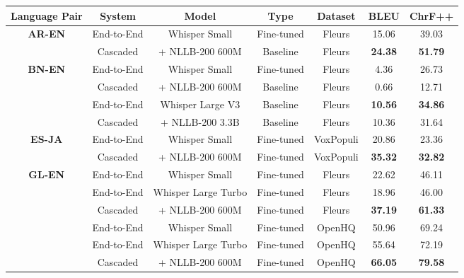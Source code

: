 \begin{table*}[ht]
\centering
\begin{tabular}{@{}ccccccc@{}}
\toprule
\textbf{Language Pair} & \textbf{System} & \textbf{Model} & \textbf{Type} & \textbf{Dataset} & \textbf{BLEU} & \textbf{ChrF++} \\ \midrule
\multirow{2}{*}{\textbf{AR-EN}} & End-to-End & Whisper Small       & Fine-tuned & Fleurs    & 15.06          & 39.03          \\
                                & Cascaded   & + NLLB-200 600M     & Baseline   & Fleurs    & \textbf{24.38} & \textbf{51.79} \\ \midrule
\multirow{4}{*}{\textbf{BN-EN}} & End-to-End & Whisper Small       & Fine-tuned & Fleurs    & 4.36           & 26.73          \\
                                & Cascaded   & + NLLB-200 600M           & Baseline   & Fleurs    & 0.66 & 12.71 \\ \cmidrule(l){2-7}
                                & End-to-End & Whisper Large V3       & Baseline & Fleurs    &  \textbf{10.56}    & \textbf{34.86}         \\
                                & Cascaded   & + NLLB-200 3.3B           & Baseline   & Fleurs    &  10.36 & 31.64 \\ \midrule
\multirow{2}{*}{\textbf{ES-JA}} & End-to-End & Whisper Small       & Fine-tuned          & VoxPopuli & 20.86          & 23.36          \\
                                & Cascaded   & + NLLB-200 600M     & Fine-tuned          & VoxPopuli & \textbf{35.32} & \textbf{32.82} \\ \midrule
\multirow{6}{*}{\textbf{GL-EN}} & End-to-End & Whisper Small       & Fine-tuned & Fleurs    & 22.62          & 46.11          \\
                                & End-to-End & Whisper Large Turbo & Fine-tuned & Fleurs    & 18.96          & 46.00          \\
                                & Cascaded   & + NLLB-200 600M     & Fine-tuned & Fleurs    & \textbf{37.19} & \textbf{61.33} \\ \cmidrule(l){2-7} 
                                & End-to-End & Whisper Small       & Fine-tuned & OpenHQ    & 50.96          & 69.24          \\
                                & End-to-End & Whisper Large Turbo & Fine-tuned & OpenHQ    & 55.64          & 72.19          \\
                                & Cascaded   & + NLLB-200 600M     & Fine-tuned & OpenHQ    & \textbf{66.05} & \textbf{79.58} \\ \midrule

\end{tabular}
\end{table*}
